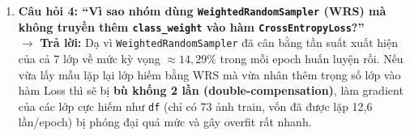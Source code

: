 \documentclass[11pt,a4paper]{article}
\begin{document}
\begin{enumerate}
    \item \textbf{Câu hỏi 4: ``Vì sao nhóm dùng \texttt{WeightedRandomSampler} (WRS) mà không truyền thêm \texttt{class\_weight} vào hàm \texttt{CrossEntropyLoss}?''}\\
    $\rightarrow$ \textbf{Trả lời:} Dạ vì \texttt{WeightedRandomSampler} đã cân bằng tần suất xuất hiện của cả 7 lớp về mức kỳ vọng $\approx 14{,}29\%$ trong mỗi epoch huấn luyện rồi. Nếu vừa lấy mẫu lặp lại lớp hiếm bằng WRS mà vừa nhân thêm trọng số lớp vào hàm Loss thì sẽ bị \textbf{bù khống 2 lần (double-compensation)}, làm gradient của các lớp cực hiếm như \texttt{df} (chỉ có 73 ảnh train, vốn đã được lặp 12,6 lần/epoch) bị phóng đại quá mức và gây overfit rất nhanh.
\end{enumerate}
\end{document}
